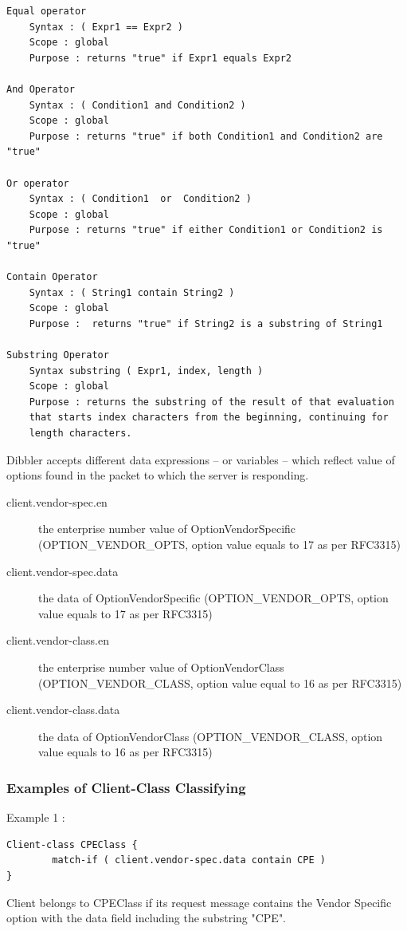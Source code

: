 \begin{lstlisting}
Equal operator
    Syntax : ( Expr1 == Expr2 )
    Scope : global
    Purpose : returns "true" if Expr1 equals Expr2

And Operator
    Syntax : ( Condition1 and Condition2 )
    Scope : global
    Purpose : returns "true" if both Condition1 and Condition2 are "true"

Or operator
    Syntax : ( Condition1  or  Condition2 )
    Scope : global
    Purpose : returns "true" if either Condition1 or Condition2 is "true"

Contain Operator
    Syntax : ( String1 contain String2 )
    Scope : global
    Purpose :  returns "true" if String2 is a substring of String1

Substring Operator
    Syntax substring ( Expr1, index, length )
    Scope : global
    Purpose : returns the substring of the result of that evaluation
    that starts index characters from the beginning, continuing for
    length characters. 
\end{lstlisting}

Dibbler accepts different data expressions -- or variables -- which
reflect value of options found in the packet to which the server is
responding.

\begin{description}
\item[client.vendor-spec.en] the enterprise number value of
  OptionVendorSpecific (OPTION\_VENDOR\_OPTS, option value equals to 17
  as per RFC3315)
\item[client.vendor-spec.data] the data of OptionVendorSpecific
  (OPTION\_VENDOR\_OPTS, option value equals to 17 as per RFC3315)
\item[client.vendor-class.en] the enterprise number value of
  OptionVendorClass (OPTION\_VENDOR\_CLASS, option value equal to 16 as
  per RFC3315)
\item[client.vendor-class.data] the data of OptionVendorClass
  (OPTION\_VENDOR\_CLASS, option value equals to 16 as per RFC3315)
\end{description}

\subsubsection{Examples of Client-Class Classifying}

Example 1 :
\begin{lstlisting}
Client-class CPEClass {
        match-if ( client.vendor-spec.data contain CPE )
}
\end{lstlisting}
Client belongs to CPEClass if its request message contains the Vendor
Specific option with the data field including the substring "CPE".


